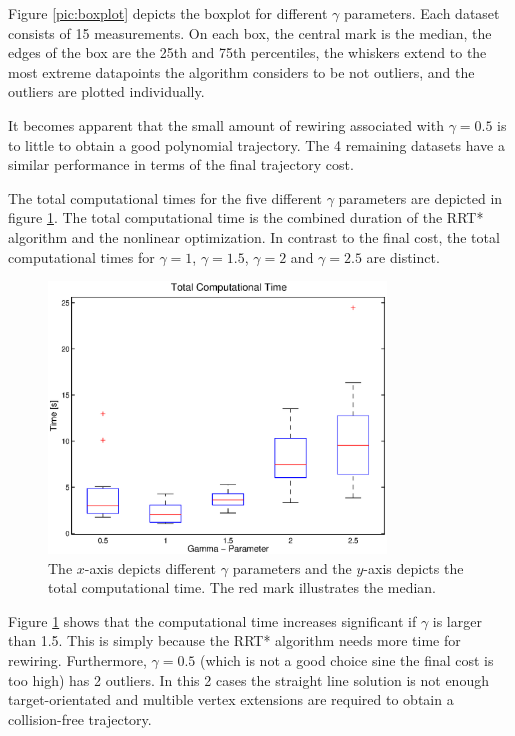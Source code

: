 Figure \ref{pic:boxplot} depicts the boxplot for different $\gamma$ parameters. Each dataset consists of 15 measurements. On each box, the central mark is the median, the edges of the box are the 25th and 75th percentiles, the whiskers extend to the most extreme
datapoints the algorithm considers to be not outliers, and the outliers are plotted individually. \newline





It becomes apparent that the small amount of rewiring associated with $\gamma = 0.5$ is to little to obtain a good polynomial trajectory. The 4 remaining datasets have a similar performance in terms of the final trajectory cost. \newline

The total computational times for the five different $\gamma$ parameters are depicted in figure \ref{pic:boxplot_time}. The total computational time is the combined duration of the RRT* algorithm and the nonlinear optimization. In contrast to the final cost, the total computational times for $\gamma = 1 $, $\gamma = 1.5$, $\gamma = 2$ and $\gamma = 2.5$ are distinct. 

\begin{figure}[h]
   \centering
   \includegraphics[trim = 14mm 10mm 15mm 0mm,clip,width=0.8\textwidth]{pics/boxplot_time.eps}
   \caption{The $x$-axis depicts different $\gamma$ parameters and the $y$-axis depicts the total computational time. The red mark illustrates the median.}
   \label{pic:boxplot_time}
\end{figure}

Figure \ref{pic:boxplot_time} shows that the computational time increases significant if $\gamma$ is larger than 1.5. This is simply because the RRT* algorithm needs more time for rewiring. Furthermore, $\gamma = 0.5$ (which is not a good choice sine the final cost is too high) has 2 outliers. In this 2 cases the straight line solution is not enough target-orientated and multible vertex extensions are required to obtain a collision-free trajectory. \newline

